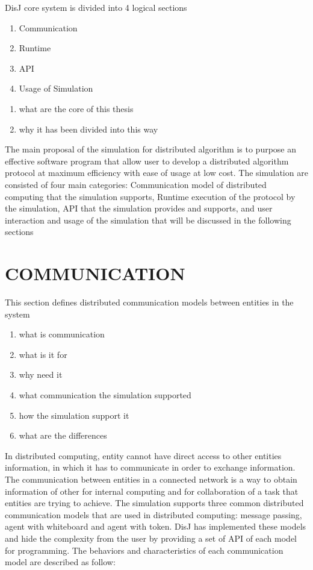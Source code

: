 DisJ core system is divided into 4 logical sections
\begin{enumerate}
\item Communication
\item Runtime
\item API
\item Usage of Simulation
\end{enumerate}

\begin{enumerate}
\item what are the core of this thesis
\item why it has been divided into this way
\end{enumerate}

The main proposal of the simulation for distributed algorithm is to purpose an effective software program that allow user to develop a distributed algorithm protocol at maximum efficiency with ease of usage at low cost. The simulation are consisted of four main categories: Communication model of distributed computing that the simulation supports, Runtime execution of the protocol by the simulation, API that the simulation provides and supports, and user interaction and usage of the simulation that will be discussed in the following sections


\section{COMMUNICATION}

This section defines distributed communication models between entities in the system
\begin{enumerate}
\item what is communication
\item what is it for
\item why need it
\item what communication the simulation supported
\item how the simulation support it
\item what are the differences
\end{enumerate}

In distributed computing, entity cannot have direct access to other entities information, in which it has to communicate in order to exchange information. The communication between entities in a connected network is a way to obtain information of other for internal computing and for collaboration of a task that entities are trying to achieve. The simulation supports three common distributed communication models that are used in distributed computing: message passing, agent with whiteboard and agent with token. DisJ has implemented these models and hide the complexity from the user by providing a set of API of each model for programming. The behaviors and characteristics of each communication model are described as follow:

